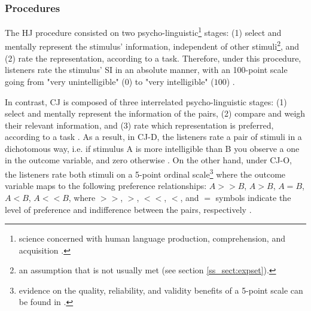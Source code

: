 \subsubsection{Procedures} \label{ss_sect:proc}
%
The HJ procedure consisted on two psycho-linguistic\footnote{science concerned with human language production, comprehension, and acquisition \citep{Levelt_1993}.} stages: (1) select and mentally represent the stimulus' information, independent of other stimuli\footnote{an assumption that is not usually met (see section \ref{ss_sect:expset}).}, and (2) rate the representation, according to a task. Therefore, under this procedure, listeners rate the stimulus' SI in an absolute manner, with an 100-point scale going from "very unintelligible" ($0$) to "very intelligible" ($100$) \citep{Boonen_et_al_2021, Faes_et_al_2021}.

In contrast, CJ is composed of three interrelated psycho-linguistic stages: (1) select and mentally represent the information of the pairs, (2) compare and weigh their relevant information, and (3) rate which representation is preferred, according to a task \citep{vanDaal_2020}. As a result, in CJ-D, the listeners rate a pair of stimuli in a dichotomous way, i.e. if stimulus A is more intelligible than B you observe a one in the outcome variable, and zero otherwise \citep{Bradley_et_al_1952}. On the other hand, under CJ-O, the listeners rate both stimuli on a 5-point ordinal scale\footnote{evidence on the quality, reliability, and validity benefits of a 5-point scale can be found in \citet{Revilla_et_al_2014}.} where the outcome variable maps to the following preference relationships: $A>>B$, $A>B$, $A=B$, $A<B$, $A<<B$, where $>>$, $>$, $<<$, $<$, and $=$ symbols indicate the level of preference and indifference between the pairs, respectively \citep{Tutz_1986, Agresti_1992}.
%
%
